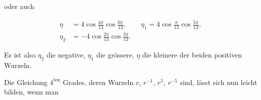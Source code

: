 oder auch

\[
\begin{aligned}
\eta &= 4\cos\frac{4\pi}{13}\cos\frac{6\pi}{13}, \qquad \eta_1 = 4\cos\frac{\pi}{13}\cos\frac{5\pi}{13},\\
\eta_2 &= -4\cos\frac{2\pi}{13}\cos\frac{3\pi}{13}.
\end{aligned}
\]

Es ist also $\eta_2$ die negative, $\eta_1$ die grössere, $\eta$ die kleinere der
beiden positiven Wurzeln.

Die Gleichung $4^{\mathrm{ten}}$ Grades, deren Wurzeln $r$, $r^{-1}$, $r^5$, $r^{-5}$
sind, lässt sich nun leicht bilden, wenn man
